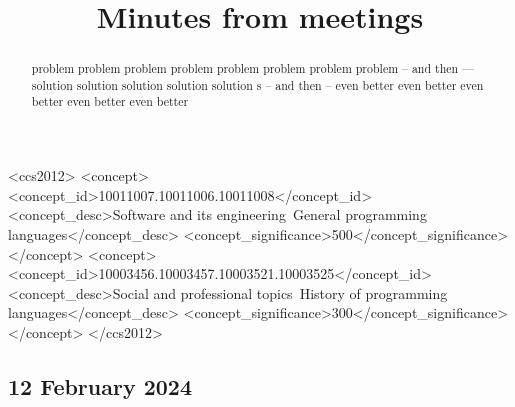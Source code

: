 \documentclass[acmsmall,review,anonymous]{acmart}\settopmatter{printfolios=true}
\begin{document}
\title{Minutes from meetings}
 \author{ }
\affiliation{ }
    \begin{abstract}
 problem problem  problem problem  problem problem  problem problem   
-- and then --- 
solution  solution solution  solution solution  s 
-- and then --
even better even better even better even better even better \end{abstract}


\begin{CCSXML}
<ccs2012>
<concept>
<concept_id>10011007.10011006.10011008</concept_id>
<concept_desc>Software and its engineering~General programming languages</concept_desc>
<concept_significance>500</concept_significance>
</concept>
<concept>
<concept_id>10003456.10003457.10003521.10003525</concept_id>
<concept_desc>Social and professional topics~History of programming languages</concept_desc>
<concept_significance>300</concept_significance>
</concept>
</ccs2012>
\end{CCSXML}










\maketitle 

\subsection* {12 February 2024}
\end{document}
